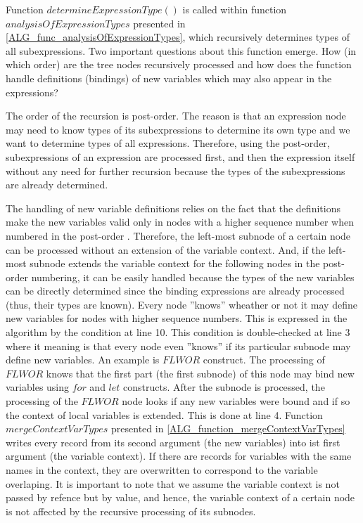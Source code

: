 Function $determineExpressionType()$ is called within function $analysisOfExpressionTypes$ presented in \ref{ALG_func_analysisOfExpressionTypes}, which recursively determines types of all subexpressions. Two important questions about this function emerge. How (in which order) are the tree nodes recursively processed and how does the function handle definitions (bindings) of new variables which may also appear in the expressions?

The order of the recursion is post-order. The reason is that an expression node may need to know types of its subexpressions to determine its own type and we want to determine types of all expressions. Therefore, using the post-order, subexpressions of an expression are processed first, and then the expression itself without any need for further recursion because the types of the subexpressions are already determined.

The handling of new variable definitions relies on the fact that the definitions make the new variables valid only in nodes with a higher sequence number when numbered in the post-order . Therefore, the left-most subnode of a certain node can be processed without an extension of the variable context. And, if the left-most subnode extends the variable context for the following nodes in the post-order numbering, it can be easily handled because the types of the new variables can be directly determined since the binding expressions are already processed (thus, their types are known). Every node ''knows'' wheather or not it may define new variables for nodes with higher sequence numbers. This is expressed in the algorithm by the condition at line 10. This condition is double-checked at line 3 where it meaning is that every node even ''knows'' if its particular subnode may define new variables. An example is $FLWOR$ construct. The processing of $FLWOR$ knows that the first part (the first subnode) of this node may bind new variables using $for$ and $let$ constructs. After the subnode is processed, the processing of the $FLWOR$ node looks if any new variables were bound and if so the context of local variables is extended. This is done at line 4. Function $mergeContextVarTypes$ presented in \ref{ALG_function_mergeContextVarTypes} writes every record from its second argument (the new variables) into ist first argument (the variable context). If there are records for variables with the same names in the context, they are overwritten to correspond to the variable overlaping. It is important to note that we assume the variable context is not passed by refence but by value, and hence, the variable context of a certain node is not affected by the recursive processing of its subnodes.

